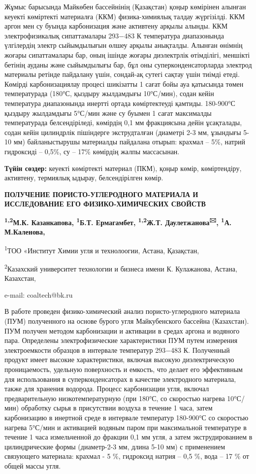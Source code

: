 Жұмыс барысында Майкөбен бассейнінің (Қазақстан) қоңыр көмірінен алынған
кеуекті көміртекті материалға (ККМ) физика-химиялық талдау жүргізілді.
ККМ аргон мен су буында карбонизация және активтену арқылы алынды. ККМ
электрофизикалық сипаттамалары 293−483 К температура диапазонында
үлгілердің электр сыйымдылығын өлшеу арқылы анықталды. Алынған өнімнің
жоғары сипаттамалары бар, оның ішінде жоғары диэлектрлік өтімділігі,
меншікті бетінің ауданы және сыйымдылығы бар, бұл оны
суперконденсаторларда электрод материалы ретінде пайдалану үшін,
сондай-ақ сутегі сақтау үшін тиімді етеді. Көмірді карбонизациялау
процесі шикізатты 1 сағат бойы ауа қатысында төмен температурада (180°С,
қыздыру жылдамдығы 10°С/мин), содан кейін температура диапазонында
инертті ортада көміртектеуді қамтиды. 180-900°С қыздыру жылдамдығы
5°С/мин және су буымен 1 сағат максималды температурада белсендіріледі,
көмірдің 0,1 мм фракциясына дейін ұсақталады, содан кейін цилиндрлік
пішіндерге экструдталған (диаметрі 2-3 мм, ұзындығы 5-10 мм)
байланыстырушы материалды пайдалана отырып: крахмал -- 5\%, натрий
гидроксиді -- 0,5\%, су -- 17\% көмірдің жалпы массасынан.

{\bfseries Түйін сөздер:} кеуекті көміртекті материал (ПКМ), қоңыр көмір,
көміртендіру, активтену, термиялық ыдырау, белсендірілген көмір.
\newpage
\begin{center}
{\large\bfseries ПОЛУЧЕНИЕ ПОРИСТО-УГЛЕРОДНОГО МАТЕРИАЛА И ИССЛЕДОВАНИЕ ЕГО
ФИЗИКО-ХИМИЧЕСКИХ СВОЙСТВ}

{\bfseries \textsuperscript{1,2}М.К. Казанкапова, \textsuperscript{1}Б.Т.
Ермагамбет, \textsuperscript{1,2}Ж.Т. Даулетжанова\textsuperscript{🖂},
\textsuperscript{1}А. М.Каленова,}

\textsuperscript{1}ТОО «Институт Химии угля и технолоогии, Астана,
Қазақстан,

\textsuperscript{2}Казахский университет технологии и бизнеса имени К.
Кулажанова, Астана, Казахстан,

e-mail: coaltech@bk.ru
\end{center}

В работе проведен физико-химический анализ пористо-углеродного материала
(ПУМ) полученного на основе бурого угля Майкубенского бассейна
(Казахстан). ПУМ получен методом карбонизации и активации в средах
аргона и водяного пара. Определены электрофизические характеристики ПУМ
путем измерения электроемкости образцов в интервале температур 293−483
К. Полученный продукт имеет высокие характеристики, включая высокую
диэлектрическую проницаемость, удельную поверхность и емкость, что
делает его эффективным для использования в суперконденсаторах в качестве
электродного материала, также для хранения водорода. Процесс
карбонизации угля, включал предварительную низкотемпературную (при
180°С, со скоростью нагрева 10°С/мин) обработку сырья в присутствии
воздуха в течение 1 часа, затем карбонизацию в инертной среде в
интервале температур 180-900°С со скоростью нагрева 5°С/мин и активацией
водяным паром при максимальной температуре в течение 1 часа измельченной
до фракции 0,1 мм угля, а затем экструдированием в цилиндрические формы
(диаметр-2-3 мм, длина 5-10 мм) с применением связующего материала:
крахмал - 5 \%, гидроксид натрия -- 0,5 \%, вода -- 17 \% от общей массы
угля.

